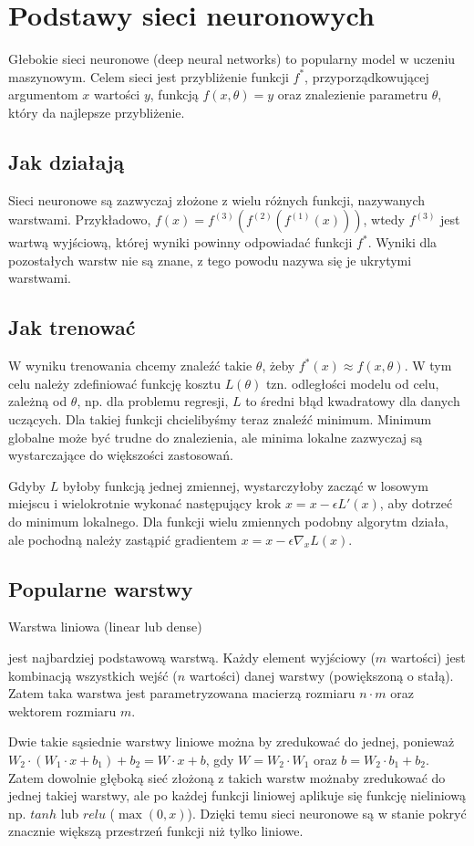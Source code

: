 \section{Podstawy sieci neuronowych}
Głebokie sieci neuronowe (deep neural networks) to popularny model w uczeniu maszynowym.
Celem sieci jest przybliżenie funkcji $f^*$, przyporządkowującej argumentom $x$ wartości
$y$, funkcją $f(x,\theta)=y$ oraz znalezienie parametru $\theta$, który da najlepsze
przybliżenie.
\subsection{Jak działają}
Sieci neuronowe są zazwyczaj złożone z wielu różnych funkcji, nazywanych warstwami. Przykładowo,
$f(x)=f^{(3)}(f^{(2)}(f^{(1)}(x)))$, wtedy $f^{(3)}$ jest wartwą wyjściową, której wyniki
powinny odpowiadać funkcji $f^*$. Wyniki dla pozostałych warstw nie są znane, z tego
powodu nazywa się je ukrytymi warstwami.
\subsection{Jak trenować}
W wyniku trenowania chcemy znaleźć takie $\theta$, żeby $f^*(x)\approx f(x,\theta)$.
W tym celu należy zdefiniować funkcję kosztu $L(\theta)$ tzn. odległości modelu 
od celu, zależną od $\theta $,
np. dla problemu regresji, $L$ to średni błąd kwadratowy dla danych uczących. 
Dla takiej funkcji chcielibyśmy teraz znaleźć minimum. Minimum globalne może być trudne
do znalezienia, ale minima lokalne zazwyczaj są wystarczające do większości zastosowań.


Gdyby $L$ byłoby funkcją jednej zmiennej, wystarczyłoby zacząć w losowym miejscu i
wielokrotnie wykonać następujący
krok $x=x-\epsilon L'(x)$, aby dotrzeć do minimum lokalnego. Dla funkcji
wielu zmiennych podobny algorytm działa, ale pochodną należy zastąpić gradientem
$x=x-\epsilon \nabla _x L(x)$.
\subsection{Popularne warstwy}
Warstwa liniowa (linear lub dense)

 jest najbardziej podstawową warstwą. Każdy 
element wyjściowy ($m$ wartości) jest kombinacją wszystkich wejść ($n$ wartości)
danej warstwy (powiększoną o stałą). Zatem taka warstwa jest parametryzowana
macierzą rozmiaru $n \cdot m$ oraz wektorem rozmiaru $m$.

Dwie takie sąsiednie warstwy liniowe można by zredukować do jednej, ponieważ
$W_2 \cdot (W_1 \cdot x + b_1) +b_2 = W \cdot x + b$, gdy $W=W_2 \cdot W_1$ oraz
$b = W_2 \cdot b_1 +b_2$. Zatem dowolnie głęboką sieć złożoną z takich warstw
możnaby zredukować do jednej takiej warstwy, ale po każdej funkcji liniowej aplikuje
się funkcję nieliniową np. $tanh$ lub $relu$ ($\max(0,x)$). Dzięki temu sieci neuronowe
są w stanie pokryć znacznie większą przestrzeń funkcji niż tylko liniowe.

